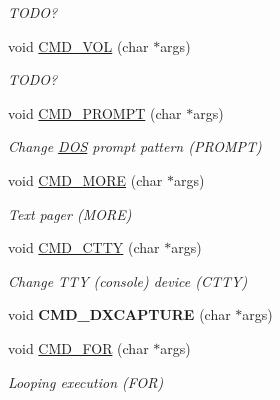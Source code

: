 \begin{DoxyCompactItemize}
\begin{DoxyCompactList}\small\item\em T\-O\-D\-O? \end{DoxyCompactList}\item 
\hypertarget{classDOS__Shell_ad4529bb89fb7c10cc6e98cde3b84f876}{void \hyperlink{classDOS__Shell_ad4529bb89fb7c10cc6e98cde3b84f876}{C\-M\-D\-\_\-\-V\-O\-L} (char $\ast$args)}\label{classDOS__Shell_ad4529bb89fb7c10cc6e98cde3b84f876}

\begin{DoxyCompactList}\small\item\em T\-O\-D\-O? \end{DoxyCompactList}\item 
\hypertarget{classDOS__Shell_a11b29015ed77577516d699150068d3fe}{void \hyperlink{classDOS__Shell_a11b29015ed77577516d699150068d3fe}{C\-M\-D\-\_\-\-P\-R\-O\-M\-P\-T} (char $\ast$args)}\label{classDOS__Shell_a11b29015ed77577516d699150068d3fe}

\begin{DoxyCompactList}\small\item\em Change \hyperlink{classDOS}{D\-O\-S} prompt pattern (P\-R\-O\-M\-P\-T) \end{DoxyCompactList}\item 
\hypertarget{classDOS__Shell_a31d3f8107e9fc6bf368b02f5b15c861e}{void \hyperlink{classDOS__Shell_a31d3f8107e9fc6bf368b02f5b15c861e}{C\-M\-D\-\_\-\-M\-O\-R\-E} (char $\ast$args)}\label{classDOS__Shell_a31d3f8107e9fc6bf368b02f5b15c861e}

\begin{DoxyCompactList}\small\item\em Text pager (M\-O\-R\-E) \end{DoxyCompactList}\item 
\hypertarget{classDOS__Shell_ab4e4f875c54408e1c040ee0aa65b5314}{void \hyperlink{classDOS__Shell_ab4e4f875c54408e1c040ee0aa65b5314}{C\-M\-D\-\_\-\-C\-T\-T\-Y} (char $\ast$args)}\label{classDOS__Shell_ab4e4f875c54408e1c040ee0aa65b5314}

\begin{DoxyCompactList}\small\item\em Change T\-T\-Y (console) device (C\-T\-T\-Y) \end{DoxyCompactList}\item 
\hypertarget{classDOS__Shell_af83074f3b9cbccf5265a95ad780311e5}{void {\bfseries C\-M\-D\-\_\-\-D\-X\-C\-A\-P\-T\-U\-R\-E} (char $\ast$args)}\label{classDOS__Shell_af83074f3b9cbccf5265a95ad780311e5}

\item 
\hypertarget{classDOS__Shell_a0d8acfd37eae2734a4a2cf623eafa536}{void \hyperlink{classDOS__Shell_a0d8acfd37eae2734a4a2cf623eafa536}{C\-M\-D\-\_\-\-F\-O\-R} (char $\ast$args)}\label{classDOS__Shell_a0d8acfd37eae2734a4a2cf623eafa536}

\begin{DoxyCompactList}\small\item\em Looping execution (F\-O\-R) \end{DoxyCompactList}\end{DoxyCompactItemize}
